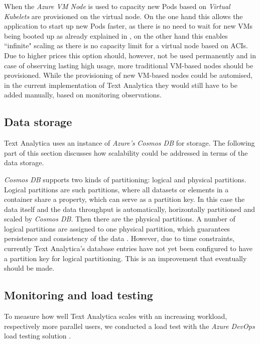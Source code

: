 \documentclass[conference]{IEEEtran}
\begin{document}
When the \textit{Azure VM Node} is used to capacity new Pods based on \textit{Virtual Kubelets} are provisioned on the virtual node. On the one hand this allows the application to start up new Pods faster, as there is no need to wait for new VMs being booted up as already explained in , on the other hand this enables ``infinite" scaling as there is no capacity limit for a virtual node based on ACIs. Due to higher prices this option should, however, not be used permanently and in case of observing lasting high usage, more traditional VM-based nodes should be provisioned. While the provisioning of new VM-based nodes could be automised, in the current implementation of Text Analytica they would still have to be added manually, based on monitoring observations.

\subsection{Data storage}
Text Analytica uses an instance of \textit{Azure's} \textit{Cosmos DB} for storage. The following part of this section discusses how scalability could be addressed in terms of the data storage.

\textit{Cosmos DB} supports two kinds of partitioning: logical and physical partitions. Logical partitions are such partitions, where all datasets or elements in a container share a property, which can serve as a partition key. In this case the data itself and the data throughput is automatically, horizontally partitioned and scaled by \textit{Cosmos DB}. Then there are the physical partitions. A number of logical partitions are assigned to one physical partition, which guarantees persistence and consistency of the data \cite{CosmosDBHorScal}. However, due to time constraints, currently Text Analytica's database entries have not yet been configured to have a partition key for logical partitioning. This is an improvement that eventually should be made.

\subsection{Monitoring and load testing}
To measure how well Text Analytica scales with an increasing workload, respectively more parallel users, we conducted a load test with the \textit{Azure DevOps} load testing solution \cite{AzureLoadTest}.
\end{document}
